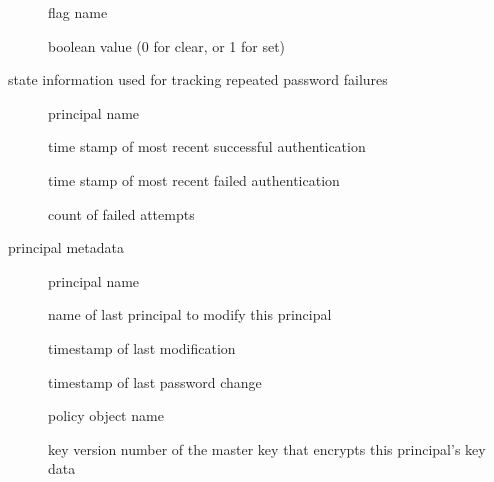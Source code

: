 \documentclass[letterpaper,10pt,english]{sphinxmanual}
\begin{document}
\begin{description}
\begin{description}
\item[{}] \leavevmode
\sphinxAtStartPar
flag name

\item[{}] \leavevmode
\sphinxAtStartPar
boolean value (0 for clear, or 1 for set)

\end{description}

\item[{\sphinxstylestrong{princ\_lockout}}] \leavevmode
\sphinxAtStartPar
state information used for tracking repeated password failures
\begin{description}
\item[{}] \leavevmode
\sphinxAtStartPar
principal name

\item[{}] \leavevmode
\sphinxAtStartPar
time stamp of most recent successful authentication

\item[{}] \leavevmode
\sphinxAtStartPar
time stamp of most recent failed authentication

\item[{}] \leavevmode
\sphinxAtStartPar
count of failed attempts

\end{description}

\item[{\sphinxstylestrong{princ\_meta}}] \leavevmode
\sphinxAtStartPar
principal metadata
\begin{description}
\item[{}] \leavevmode
\sphinxAtStartPar
principal name

\item[{}] \leavevmode
\sphinxAtStartPar
name of last principal to modify this principal

\item[{}] \leavevmode
\sphinxAtStartPar
timestamp of last modification

\item[{}] \leavevmode
\sphinxAtStartPar
timestamp of last password change

\item[{}] \leavevmode
\sphinxAtStartPar
policy object name

\item[{}] \leavevmode
\sphinxAtStartPar
key version number of the master key that encrypts this
principal’s key data


\end{description}
\end{description}
\end{document}
